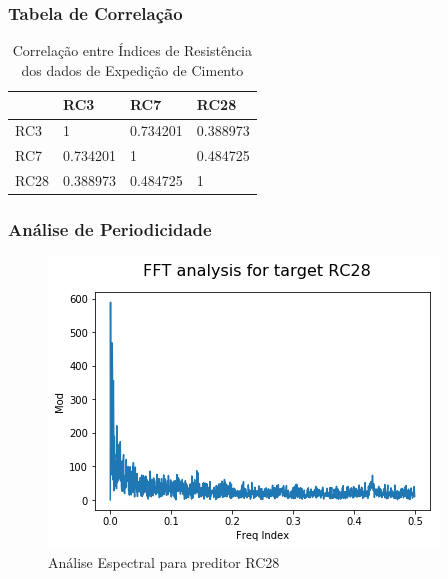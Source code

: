 \documentclass{beamer}
\begin{document}
\begin{frame}
\frametitle{Tabela de Correlação}
\begin{table}[H]
\centering
\begin{tabular}{l|lll}
\cline{2-4}
\textbf{}                  & \multicolumn{1}{l|}{RC3} & \multicolumn{1}{l|}{RC7} & \multicolumn{1}{l|}{RC28} \\ \hline
\multicolumn{1}{|l|}{RC3}  & 1                        & 0.734201                 & 0.388973                  \\ \cline{1-1}
\multicolumn{1}{|l|}{RC7}  & 0.734201                 & 1                        & 0.484725                  \\ \cline{1-1}
\multicolumn{1}{|l|}{RC28} & 0.388973                 & 0.484725                 & 1                         \\ \cline{1-1}
\end{tabular}
\caption{Correlação entre Índices de Resistência dos dados de
  Expedição de Cimento}
\label{corr3728}
\end{table}

\end{frame}

\begin{frame}
\frametitle{Análise de Periodicidade}
\begin{figure}[H]
\centering
\includegraphics[scale=0.6]{FFT_RC28.png}
\caption{Análise Espectral para preditor RC28}
\end{figure}

\end{frame}
\end{document}
